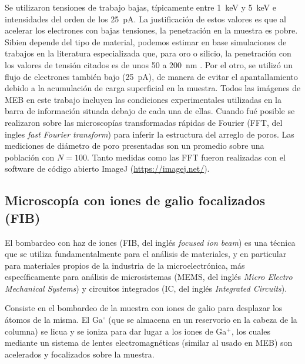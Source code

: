 		Se utilizaron tensiones de trabajo bajas, típicamente entre \SI{1}{\kilo\electronvolt} y \SI{5}{\kilo\electronvolt} e intensidades del orden de los \SI{25}{\pA}. La justificación de estos valores es que al acelerar los electrones con bajas tensiones, la penetración en la muestra es pobre. Si\space bien depende del tipo de material, podemos estimar en base simulaciones de trabajos en la literatura especializada que, para oro o silicio, la penetración con los valores de tensión citados es de unos 50 a \SI{200}{\nm} \cite{Joy1984,Shur2012,Hafner2007}. Por el otro, se utilizó un flujo de electrones también bajo (\SI{25}{\pA}), de manera de evitar el apantallamiento debido a la acumulación de carga superficial en la muestra. Todos las imágenes de MEB en este trabajo incluyen las condiciones experimentales utilizadas en la barra de información situada debajo de cada una de ellas. Cuando fué posible se realizaron sobre las microscopías transformadas rápidas de Fourier (FFT, del ingles \textit{fast Fourier transform}) para inferir la estructura del arreglo de poros. Las mediciones de diámetro de poro presentadas son un promedio sobre una población con $N=100$. Tanto  medidas como las FFT fueron realizadas con el software de código abierto ImageJ (\url{https://imagej.net/})\cite{ImageJ2012}.	
					
	\subsection{Microscopía con iones de galio focalizados (FIB)}\label{sec:FIB}

		El bombardeo con haz de iones (FIB, del inglés \textit{focused ion beam}) es una técnica que se utiliza fundamentalmente para el análisis de materiales, y en particular para materiales propios de la industria de la microelectrónica, más específicamente para análisis de microsistemas (MEMS, del inglés \textit{Micro Electro Mechanical Systems}) y circuitos integrados (IC, del inglés \textit{Integrated Circuits}). 

		Consiste en el bombardeo de la muestra con iones de galio para desplazar los átomos de la misma. El Ga$^{\circ}$ (que se almacena en un	reservorio en la cabeza de la columna) se licua y se ioniza para dar lugar a los iones de Ga${^+}$, los cuales mediante un sistema de lentes electromagnéticas (similar al usado en MEB) son acelerados y focalizados sobre la muestra. 

